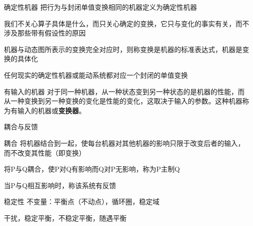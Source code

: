 \documentclass[12pt,AutoFakeBold,aspectratio=43,mathserif]{beamer}
\begin{document}
    	\begin{frame}{确定性机器}
    		把行为与封闭单值变换相同的机器定义为确定性机器
    		
    		我们不关心算子具体是什么，而只关心确定的变换，它只与变化的事实有关，而不涉及那些带有假设性的原因
    		
    		机器与动态图所表示的变换完全对应时，则称变换是机器的标准表达式，机器是变换的具体化
    		
    		任何现实的确定性机器或能动系统都对应一个封闭的单值变换
    	\end{frame}
    	\begin{frame}{有输入的机器}
    		对于同一种机器，从一种状态变到另一种状态的是机器的性能，而从一种变换到另一种变换的变化是性能的变化，这取决于输入的参数。这种机器称为有输入的机器或\textbf{变换器}。
    		\end{frame}
    	\begin{frame}{耦合与反馈}
    		\begin{block}{耦合}
    			将机器结合到一起，使每台机器对其他机器的影响只限于改变后者的输入，而不改变其性能（即变换）
    			\end{block}
    		将P与Q耦合，使P对Q有影响而Q对P无影响，称为P主制Q
    		
    		当P与Q相互影响时，称该系统有反馈
    		
    		\end{frame}
    	\begin{frame}{稳定性}
    		不变量：平衡点（不动点），循环圈，稳定域
    		\begin{figure}
            \end{figure}
    		干扰，稳定平衡，不稳定平衡，随遇平衡
    		\end{frame}
\end{document}
